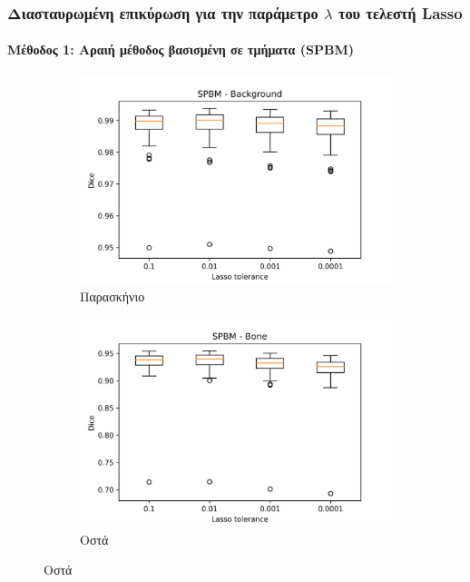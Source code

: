 \documentclass{beamer}
\begin{document}
\begin{frame}
\frametitle{Διασταυρωμένη επικύρωση για την παράμετρο $\lambda$ του τελεστή
Lasso}
\framesubtitle{Μέθοδος 1: Αραιή μέθοδος βασισμένη σε τμήματα (SPBM)}

\begin{figure}[H]
    \centering

    \begin{subfigure}[b]{0.42\linewidth}
    \includegraphics[width=\linewidth]{SPBM_Lasso_tolerance_Background_plot.png}
    \caption{Παρασκήνιο}
    \end{subfigure}
    \begin{subfigure}[b]{0.42\linewidth}
    \includegraphics[width=\linewidth]{SPBM_Lasso_tolerance_Bone_plot.png}
    \caption{Οστά}
    \end{subfigure}


\end{figure}
\end{frame}
\end{document}
